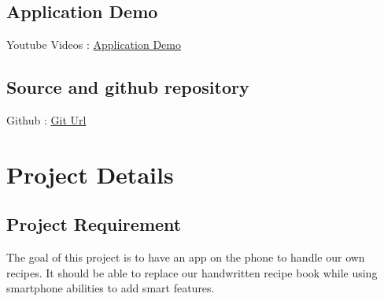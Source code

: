 \documentclass{article}
\begin{document}
\subsection{Application Demo}
Youtube Videos : \href{https://youtu.be/vgawyQmJWpk}{Application Demo}
\subsection{Source and github repository }
Github : \href{https://github.com/thphuc/cooking-app }{Git Url}


\newpage
\section{Project Details }
\subsection{Project Requirement}
\qquad The goal of this project is to have an app on the phone to handle our own recipes. It should be able to replace our handwritten recipe book while using smartphone abilities to add smart features.
\end{document}
